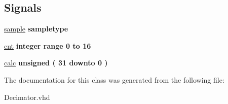 \subsection*{Signals}
 \begin{DoxyCompactItemize}
\item 
\hypertarget{class_decimator_1_1_behavioral_a3656c16c019b804c710595e3230bb130}{\hyperlink{class_decimator_1_1_behavioral_a3656c16c019b804c710595e3230bb130}{sample} {\bfseries \textcolor{vhdlchar}{sampletype}\textcolor{vhdlchar}{ }} }\label{class_decimator_1_1_behavioral_a3656c16c019b804c710595e3230bb130}

\item 
\hypertarget{class_decimator_1_1_behavioral_ae022f85d9edbb920922f929f96953588}{\hyperlink{class_decimator_1_1_behavioral_ae022f85d9edbb920922f929f96953588}{cnt} {\bfseries \textcolor{comment}{integer}\textcolor{vhdlchar}{ }\textcolor{vhdlkeyword}{range}\textcolor{vhdlchar}{ } \textcolor{vhdldigit}{0} \textcolor{vhdlchar}{ }\textcolor{vhdlchar}{ }\textcolor{vhdlchar}{ }\textcolor{vhdlkeyword}{to}\textcolor{vhdlchar}{ }\textcolor{vhdlchar}{ }\textcolor{vhdlchar}{ } \textcolor{vhdldigit}{16} \textcolor{vhdlchar}{ }} }\label{class_decimator_1_1_behavioral_ae022f85d9edbb920922f929f96953588}

\item 
\hypertarget{class_decimator_1_1_behavioral_a1333b50a56ebf14574178f92933da687}{\hyperlink{class_decimator_1_1_behavioral_a1333b50a56ebf14574178f92933da687}{calc} {\bfseries \textcolor{comment}{unsigned}\textcolor{vhdlchar}{ }\textcolor{vhdlchar}{(}\textcolor{vhdlchar}{ } \textcolor{vhdldigit}{31} \textcolor{vhdlchar}{ }\textcolor{vhdlchar}{ }\textcolor{vhdlchar}{ }\textcolor{vhdlkeyword}{downto}\textcolor{vhdlchar}{ }\textcolor{vhdlchar}{ }\textcolor{vhdlchar}{ } \textcolor{vhdldigit}{0} \textcolor{vhdlchar}{ }\textcolor{vhdlchar}{)}\textcolor{vhdlchar}{ }} }\label{class_decimator_1_1_behavioral_a1333b50a56ebf14574178f92933da687}

\end{DoxyCompactItemize}


The documentation for this class was generated from the following file\-:\begin{DoxyCompactItemize}
\item 
Decimator.\-vhd\end{DoxyCompactItemize}

